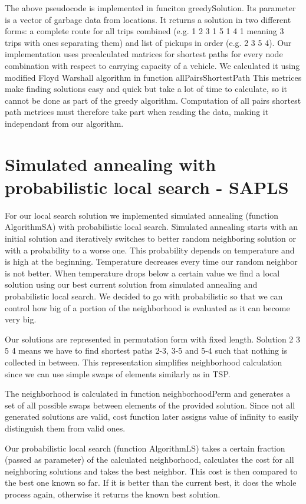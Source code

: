 \documentclass[a4paper, 12pt]{article}
\begin{document}
The above pseudocode is implemented in funciton {\sf greedySolution}. Its
parameter is a vector of garbage data from locations. It returns a solution in
two different forms: a complete route for all trips combined (e.g. 1 2 3 1 5 1
4 1 meaning 3 trips with ones separating them) and list of pickups in order
(e.g. 2 3 5 4). Our implementation uses precalculated matrices for shortest
paths for every node combination with respect to carrying capacity of a
vehicle. We calculated it using modified Floyd Warshall algorithm in function
{\sf allPairsShortestPath} This metrices make finding solutions easy and
quick but take a lot of time to calculate, so it cannot be done as part of the
greedy algorithm. Computation of all pairs shortest path metrices must
therefore take part when reading the data, making it independant from our
algorithm.

\section{Simulated annealing with probabilistic local search - SAPLS}

For our local search solution we implemented simulated annealing (function {\sf
AlgorithmSA}) with probabilistic local search. Simulated annealing starts with
an initial solution and iteratively switches to better random neighboring
solution or with a probability to a worse one. This probability depends on
temperature and is high at the beginning. Temperature decreases every time our
random neighbor is not better. When temperature drops below a certain value we
find a local solution using our best current solution from simulated annealing
and probabilistic local search. We decided to go with probabilistic so that we
can control how big of a portion of the neighborhood is evaluated as it can
become very big.

Our solutions are represented in permutation form with fixed length. Solution
2 3 5 4 means we have to find shortest paths 2-3, 3-5 and 5-4 such that nothing
is collected in between. This representation simplifies neighborhood
calculation since we can use simple swaps of elements similarly as in TSP.

The neighborhood is calculated in function {\sf neighborhoodPerm} and generates
a set of all possible swaps between elements of the provided solution. Since
not all generated solutions are valid, cost function later assigns value of
infinity to easily distinguish them from valid ones.

Our probabilistic local search (function {\sf AlgorithmLS}) takes a certain
fraction (passed as parameter) of the calculated neighborhood, calculates
the cost for all neighboring solutions and takes the best neighbor. This cost
is then compared to the best one known so far. If it is better than the current
best, it does the whole process again, otherwise it returns the known best
solution.
\end{document}
